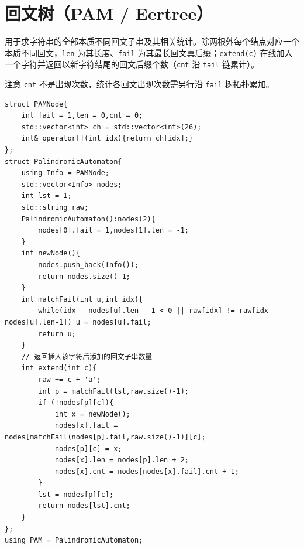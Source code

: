 \section{回文树（PAM / Eertree）}

用于求字符串的全部本质不同回文子串及其相关统计。除两根外每个结点对应一个本质不同回文，\texttt{len} 为其长度、\texttt{fail} 为其最长回文真后缀；\texttt{extend(c)} 在线加入一个字符并返回以新字符结尾的回文后缀个数（\texttt{cnt} 沿 \texttt{fail} 链累计）。

注意 \texttt{cnt} 不是出现次数，统计各回文出现次数需另行沿 \texttt{fail} 树拓扑累加。

\begin{lstlisting}
struct PAMNode{
    int fail = 1,len = 0,cnt = 0;
    std::vector<int> ch = std::vector<int>(26);
    int& operator[](int idx){return ch[idx];}
};
struct PalindromicAutomaton{
    using Info = PAMNode;
    std::vector<Info> nodes;
    int lst = 1;
    std::string raw;
    PalindromicAutomaton():nodes(2){
        nodes[0].fail = 1,nodes[1].len = -1;
    }
    int newNode(){
        nodes.push_back(Info());
        return nodes.size()-1;
    }
    int matchFail(int u,int idx){
        while(idx - nodes[u].len - 1 < 0 || raw[idx] != raw[idx-nodes[u].len-1]) u = nodes[u].fail;
        return u;
    }
    // 返回插入该字符后添加的回文子串数量
    int extend(int c){
        raw += c + 'a';
        int p = matchFail(lst,raw.size()-1);
        if (!nodes[p][c]){
            int x = newNode();
            nodes[x].fail = nodes[matchFail(nodes[p].fail,raw.size()-1)][c];
            nodes[p][c] = x;
            nodes[x].len = nodes[p].len + 2;
            nodes[x].cnt = nodes[nodes[x].fail].cnt + 1;
        }
        lst = nodes[p][c];
        return nodes[lst].cnt;
    }
};
using PAM = PalindromicAutomaton;
\end{lstlisting}
